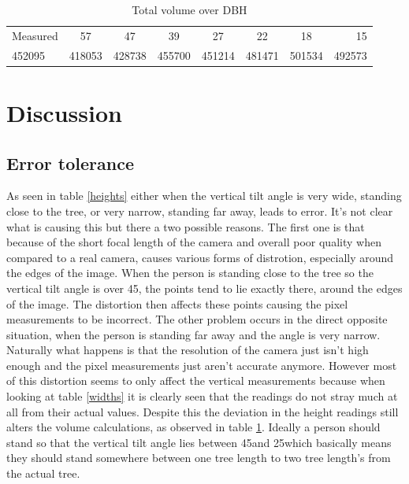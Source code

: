 \begin{table}[h!]
	\begin{center}
    	\begin{tabular}{| l c c c c c c r |}
    	\hline
		Measured & 57\degree & 47\degree & 39\degree & 27\degree & 22\degree & 18\degree & 15\degree \\
		452095   & 418053    & 428738    & 455700    & 451214    & 481471    & 501534    & 492573    \\
		\hline
		\end{tabular}
		\caption{Total volume over DBH}
		\label{volumes}
    \end{center}
\end{table}

\section{Discussion}
\subsection{Error tolerance}
As seen in table \ref{heights} either when the vertical tilt angle is very wide, standing close to the tree, or very narrow, standing far away, leads to error. It's not clear what is causing this but there a two possible reasons. The first one is that because of the short focal length of the camera and overall poor quality when compared to a real camera, causes various forms of distrotion, especially around the edges of the image. When the person is standing close to the tree so the vertical tilt angle is over 45\degree, the points tend to lie exactly there, around the edges of the image. The distortion then affects these points causing the pixel measurements to be incorrect. The other problem occurs in the direct opposite situation, when the person is standing far away and the angle is very narrow. Naturally what happens is that the resolution of the camera just isn't high enough and the pixel measurements just aren't accurate anymore. However most of this distortion seems to only affect the vertical measurements because when looking at table \ref{widths} it is clearly seen that the readings do not stray much at all from their actual values. Despite this the deviation in the height readings still alters the volume calculations, as observed in table \ref{volumes}. Ideally a person should stand so that the vertical tilt angle lies between 45\degree and 25\degree which basically means they should stand somewhere between one tree length to two tree length's from the actual tree.
